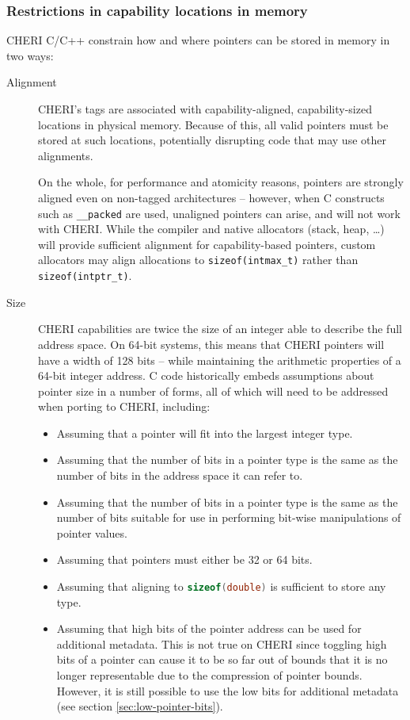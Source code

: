 \documentclass[11pt]{article}
\newcommand{\ccode}[1]{\lstinline[language={C},basicstyle=\small\ttfamily]{#1}}
\newcommand{\note}[2]{{\color{blue}[ Note: #1 - #2]}}
\renewcommand{\note}[2]{}
\newcommand{\rwnote}[1]{\note{#1}{Robert W.}}
\begin{document}
\subsubsection{Restrictions in capability locations in memory}

CHERI C/C++ constrain how and where pointers can be stored in memory in two
ways:

\begin{description}
\item[Alignment] CHERI's tags are associated with capability-aligned,
  capability-sized locations in physical memory.
  Because of this, all valid pointers must be stored at such locations,
  potentially disrupting code that may use other alignments.

  On the whole, for performance and atomicity reasons, pointers are strongly
  aligned even on non-tagged architectures -- however, when C constructs such
  as \texttt{\_\_packed} are used, unaligned pointers can arise, and will not
  work with CHERI.
  While the compiler and native allocators (stack, heap, \ldots{}) will
  provide sufficient alignment for capability-based pointers, custom
  allocators may align allocations to \texttt{sizeof(intmax\_t)} rather than
  \texttt{sizeof(intptr\_t)}.

\item[Size] CHERI capabilities are twice the size of an integer able to
  describe the full address space.
  On 64-bit systems, this means that CHERI pointers will have a width of 128
  bits -- while maintaining the arithmetic properties of a 64-bit integer
  address.
  C code historically embeds assumptions about pointer size in a number of forms,
  all of which will need to be addressed when porting to CHERI,
  including:

  \begin{itemize}
  \item Assuming that a pointer will fit into the largest integer type.
  \item Assuming that the number of bits in a pointer type is the same
    as the number of bits in the address space it can refer to.
  \item Assuming that the number of bits in a pointer type is the same as the
    number of bits suitable for use in performing bit-wise manipulations of
    pointer values.
  \item Assuming that pointers must either be 32 or 64 bits.
  \item Assuming that aligning to \ccode{sizeof(double)} is sufficient to store any type.
  \item Assuming that high bits of the pointer address can be used for
  additional metadata. This is not true on CHERI since toggling high bits of a
  pointer can cause it to be so far out of bounds that it is no longer representable
  due to the compression of pointer bounds. However, it is still possible to use
  the low bits for additional metadata (see section \ref{sec:low-pointer-bits}).
  \end{itemize}
  \rwnote{Should there be more things in this list?}
\end{description}
\end{document}
